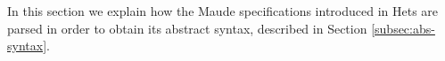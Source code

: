
In this section we explain how the Maude specifications introduced in
Hets are parsed in order to obtain its abstract syntax, described in
Section \ref{subsec:abs-syntax}.